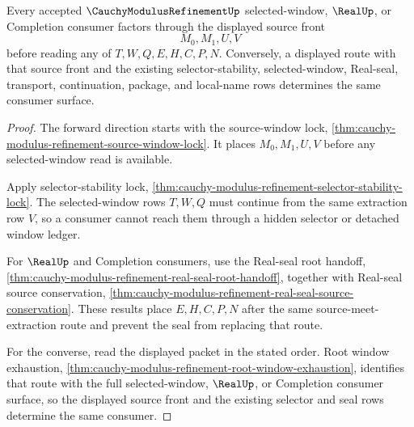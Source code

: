 \begin{theorem}
\label{thm:cauchy-modulus-refinement-source-window-front-totality}
Every accepted $\CauchyModulusRefinementUp$ selected-window, $\RealUp$, or Completion consumer factors through the displayed source front
$$
M_0,M_1,U,V
$$
before reading any of $T,W,Q,E,H,C,P,N$. Conversely, a displayed route with that source front and the existing selector-stability, selected-window, Real-seal, transport, continuation, package, and local-name rows determines the same consumer surface.
\end{theorem}
\begin{proof}
The forward direction starts with the source-window lock, \autoref{thm:cauchy-modulus-refinement-source-window-lock}. It places $M_0,M_1,U,V$ before any selected-window read is available.

Apply selector-stability lock, \autoref{thm:cauchy-modulus-refinement-selector-stability-lock}. The selected-window rows $T,W,Q$ must continue from the same extraction row $V$, so a consumer cannot reach them through a hidden selector or detached window ledger.

For $\RealUp$ and Completion consumers, use the Real-seal root handoff, \autoref{thm:cauchy-modulus-refinement-real-seal-root-handoff}, together with Real-seal source conservation, \autoref{thm:cauchy-modulus-refinement-real-seal-source-conservation}. These results place $E,H,C,P,N$ after the same source-meet-extraction route and prevent the seal from replacing that route.

For the converse, read the displayed packet in the stated order. Root window exhaustion, \autoref{thm:cauchy-modulus-refinement-root-window-exhaustion}, identifies that route with the full selected-window, $\RealUp$, or Completion consumer surface, so the displayed source front and the existing selector and seal rows determine the same consumer.
\end{proof}

